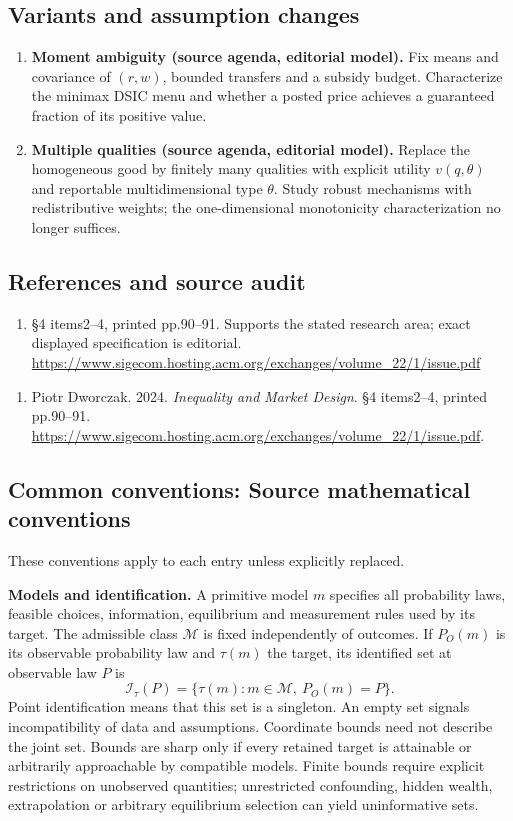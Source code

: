 \documentclass[11pt,a4paper]{article}
\begin{document}
\subsection*{Variants and assumption changes}
\begin{enumerate}
\item \textbf{Moment ambiguity (source agenda, editorial model).} Fix means and covariance of \((r,w)\), bounded transfers and a subsidy budget. Characterize the minimax DSIC menu and whether a posted price achieves a guaranteed fraction of its positive value.
\item \textbf{Multiple qualities (source agenda, editorial model).} Replace the homogeneous good by finitely many qualities with explicit utility \(v(q,\theta)\) and reportable multidimensional type \(\theta\). Study robust mechanisms with redistributive weights; the one-dimensional monotonicity characterization no longer suffices.
\end{enumerate}
\subsection*{References and source audit}
\begin{enumerate}
\item §4 items2–4, printed pp.90–91. Supports the stated research area; exact displayed specification is editorial. \url{https://www.sigecom.hosting.acm.org/exchanges/volume_22/1/issue.pdf}
\end{enumerate}
\begin{enumerate}\raggedright
\item\hypertarget{definitions:source:30007578:1}{} Piotr Dworczak. 2024. \emph{Inequality and Market Design}. §4 items2–4, printed pp.90–91.
\url{https://www.sigecom.hosting.acm.org/exchanges/volume_22/1/issue.pdf}.
\end{enumerate}

\subsection*{Common conventions: Source mathematical conventions}

These conventions apply to each entry unless explicitly replaced.

\textbf{Models and identification.} A primitive model \(m\) specifies all probability laws, feasible choices, information, equilibrium and measurement rules used by its target. The admissible class \(\mathcal M\) is fixed independently of outcomes. If \(P_O(m)\) is its observable probability law and \(\tau(m)\) the target, its identified set at observable law \(P\) is
\[
 \mathcal I_\tau(P)=\{\tau(m):m\in\mathcal M,\ P_O(m)=P\}.
\]
Point identification means that this set is a singleton. An empty set signals incompatibility of data and assumptions. Coordinate bounds need not describe the joint set. Bounds are sharp only if every retained target is attainable or arbitrarily approachable by compatible models. Finite bounds require explicit restrictions on unobserved quantities; unrestricted confounding, hidden wealth, extrapolation or arbitrary equilibrium selection can yield uninformative sets.
\end{document}
